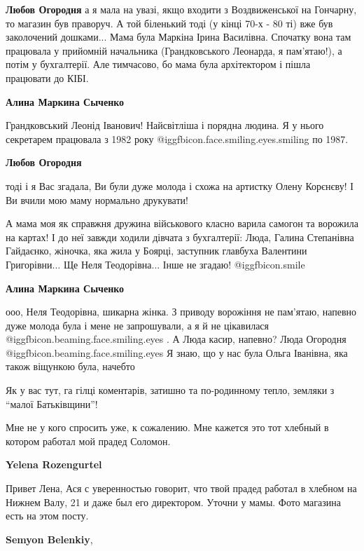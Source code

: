 \textbf{Любов Огородня} а я мала на увазі, якщо входити з Воздвиженської на Гончарну, то магазин був праворуч. А той біленький тоді (у кінці 70-х - 80 ті) вже був заколочений дошками...
Мама була Маркіна Ірина Василівна. Спочатку вона там працювала у прийомній
начальника (Грандковського Леонарда, я пам'ятаю!), а потім у бухгалтерії. Але
тимчасово, бо мама була архітектором і пішла працювати до КІБІ.

\textbf{Алина Маркина Сыченко} 

Грандковський Леонід Іванович! Найсвітліша і порядна людина. Я у нього
секретарем працювала з 1982 року @igg{fbicon.face.smiling.eyes.smiling}  по 1987.

\textbf{Любов Огородня} 

тоді і я Вас згадала, Ви були дуже молода і схожа на артистку Олену Корєнєву! І
Ви вчили мою маму нормально друкувати!

А мама моя як справжня дружина військового класно варила самогон та ворожила на
картах! І до неї завжди ходили дівчата з бухгалтерії: Люда, Галина Степанівна
Гайдаєнко, жіночка, яка жила у Боярці, заступник главбуха Валентини
Григорівни... Ще Неля Теодорівна... Інше не згадаю! @igg{fbicon.smile} 

\textbf{Алина Маркина Сыченко} 

ооо, Неля Теодорівна, шикарна жінка. З приводу ворожіння не пам'ятаю, напевно
дуже молода була і мене не запрошували, а я й не цікавилася @igg{fbicon.beaming.face.smiling.eyes} . А Люда касир,
напевно? Люда Огородня @igg{fbicon.beaming.face.smiling.eyes}  Я знаю, що у нас була Ольга Іванівна, яка також
віщункою була, начебто

Як у вас тут, га гілці коментарів, затишно та по-родинному тепло, земляки з \enquote{малої Батьківщини}!


Мне не у кого спросить уже, к сожалению. Мне кажется это тот хлебный в котором
работал мой прадед Соломон.

\textbf{Yelena Rozengurtel} 

Привет Лена, Ася с уверенностью говорит, что твой прадед работал в хлебном на
Нижнем Валу, 21 и даже был его директором. Уточни у мамы. Фото магазина есть на
этом посту.

\textbf{Semyon Belenkiy}, 

